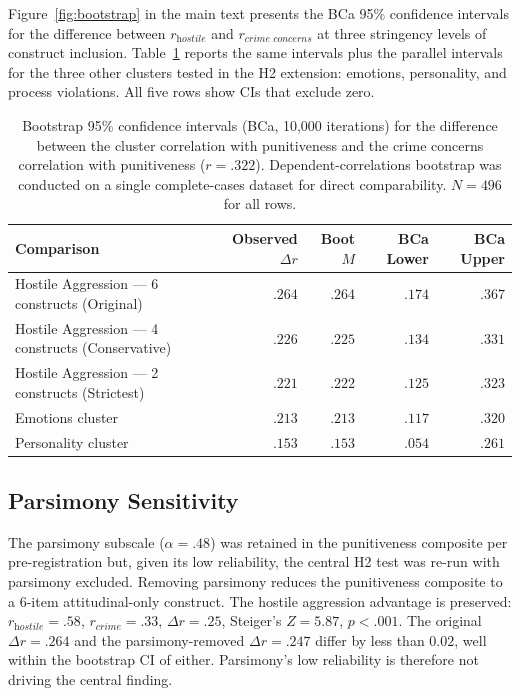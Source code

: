 Figure~\ref{fig:bootstrap} in the main text presents the BCa 95\% confidence intervals for the difference between $r_\textit{hostile}$ and $r_\textit{crime concerns}$ at three stringency levels of construct inclusion. Table~\ref{tab:supp_bootstrap_full} reports the same intervals plus the parallel intervals for the three other clusters tested in the H2 extension: emotions, personality, and process violations. All five rows show CIs that exclude zero.

\begin{table}[htbp]
  \centering
  \caption{Bootstrap 95\% confidence intervals (BCa, 10{,}000 iterations) for the difference between the cluster correlation with punitiveness and the crime concerns correlation with punitiveness ($r = .322$). Dependent-correlations bootstrap was conducted on a single complete-cases dataset for direct comparability. $N = 496$ for all rows.}
  \label{tab:supp_bootstrap_full}
  \small
  \begin{tabular}{lrrrr}
    \toprule
    Comparison & Observed $\Delta r$ & Boot $M$ & BCa Lower & BCa Upper \\
    \midrule
    Hostile Aggression --- 6 constructs (Original)   & $.264$ & $.264$ & $.174$ & $.367$ \\
    Hostile Aggression --- 4 constructs (Conservative) & $.226$ & $.225$ & $.134$ & $.331$ \\
    Hostile Aggression --- 2 constructs (Strictest)   & $.221$ & $.222$ & $.125$ & $.323$ \\
    Emotions cluster                                 & $.213$ & $.213$ & $.117$ & $.320$ \\
    Personality cluster                              & $.153$ & $.153$ & $.054$ & $.261$ \\
    \bottomrule
  \end{tabular}
\end{table}

\subsection{Parsimony Sensitivity}
\label{sec:supp_parsimony}

The parsimony subscale ($\alpha = .48$) was retained in the punitiveness composite per pre-registration but, given its low reliability, the central H2 test was re-run with parsimony excluded. Removing parsimony reduces the punitiveness composite to a 6-item attitudinal-only construct. The hostile aggression advantage is preserved: $r_\textit{hostile} = .58$, $r_\textit{crime} = .33$, $\Delta r = .25$, Steiger's $Z = 5.87$, $p < .001$. The original $\Delta r = .264$ and the parsimony-removed $\Delta r = .247$ differ by less than $0.02$, well within the bootstrap CI of either. Parsimony's low reliability is therefore not driving the central finding.

